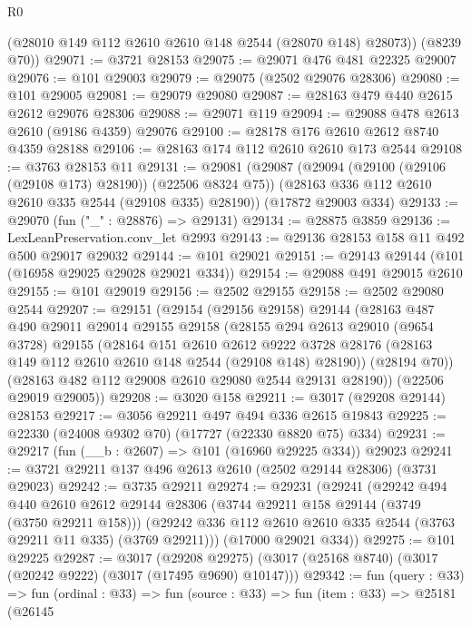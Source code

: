 \begin{lexlean}{R0}
\begin{coremodule}
        (@28010 @149 @112 @2610 @2610 @148 @2544 (@28070 @148) @28073))
      (@8239 @70))
@29071 := @3721 @28153
@29075 := @29071 @476 @481 @22325 @29007
@29076 := @101 @29003
@29079 := @29075 (@2502 @29076 @28306)
@29080 := @101 @29005
@29081 := @29079 @29080
@29087 := @28163 @479 @440 @2615 @2612 @29076 @28306
@29088 := @29071 @119
@29094 := @29088 @478 @2613 @2610 (@9186 @4359) @29076
@29100 := @28178 @176 @2610 @2612 @8740 @4359 @28188
@29106 := @28163 @174 @112 @2610 @2610 @173 @2544
@29108 := @3763 @28153 @11
@29131 := @29081
    (@29087
      (@29094 (@29100 (@29106 (@29108 @173) @28190)) (@22506 @8324 @75))
      (@28163 @336 @112 @2610 @2610 @335 @2544 (@29108 @335) @28190))
    (@17872 @29003 @334)
@29133 := @29070 (fun ("_" : @28876) => @29131)
@29134 := @28875 @3859
@29136 := LexLeanPreservation.conv_let @2993
@29143 := @29136 @28153 @158 @11 @492 @500 @29017 @29032
@29144 := @101 @29021
@29151 := @29143 @29144 (@101 (@16958 @29025 @29028 @29021 @334))
@29154 := @29088 @491 @29015 @2610
@29155 := @101 @29019
@29156 := @2502 @29155
@29158 := @2502 @29080 @2544
@29207 := @29151
    (@29154
      (@29156 @29158)
      @29144
      (@28163
        @487
        @490
        @29011
        @29014
        @29155
        @29158
        (@28155
          @294
          @2613
          @29010
          (@9654 @3728)
          @29155
          (@28164
            @151
            @2610
            @2612
            @9222
            @3728
            @28176
            (@28163 @149 @112 @2610 @2610 @148 @2544 (@29108 @148) @28190))
          (@28194 @70))
        (@28163 @482 @112 @29008 @2610 @29080 @2544 @29131 @28190))
      (@22506 @29019 @29005))
@29208 := @3020 @158
@29211 := @3017 (@29208 @29144) @28153
@29217 := @3056 @29211 @497 @494 @336 @2615 @19843
@29225 := @22330 (@24008 @9302 @70) (@17727 (@22330 @8820 @75) @334)
@29231 := @29217 (fun (__b : @2607) => @101 (@16960 @29225 @334)) @29023
@29241 := @3721 @29211 @137 @496 @2613 @2610 (@2502 @29144 @28306) (@3731 @29023)
@29242 := @3735 @29211
@29274 := @29231
    (@29241
      (@29242
        @494
        @440
        @2610
        @2612
        @29144
        @28306
        (@3744 @29211 @158 @29144 (@3749 (@3750 @29211 @158)))
        (@29242 @336 @112 @2610 @2610 @335 @2544 (@3763 @29211 @11 @335) (@3769 @29211)))
      (@17000 @29021 @334))
@29275 := @101 @29225
@29287 := @3017
    (@29208 @29275)
    (@3017 (@25168 @8740) (@3017 (@20242 @9222) (@3017 (@17495 @9690) @10147)))
@29342 := fun (query : @33) =>
  fun (ordinal : @33) =>
  fun (source : @33) =>
  fun (item : @33) =>
  @25181
    (@26145

\end{coremodule}
\end{lexlean}
